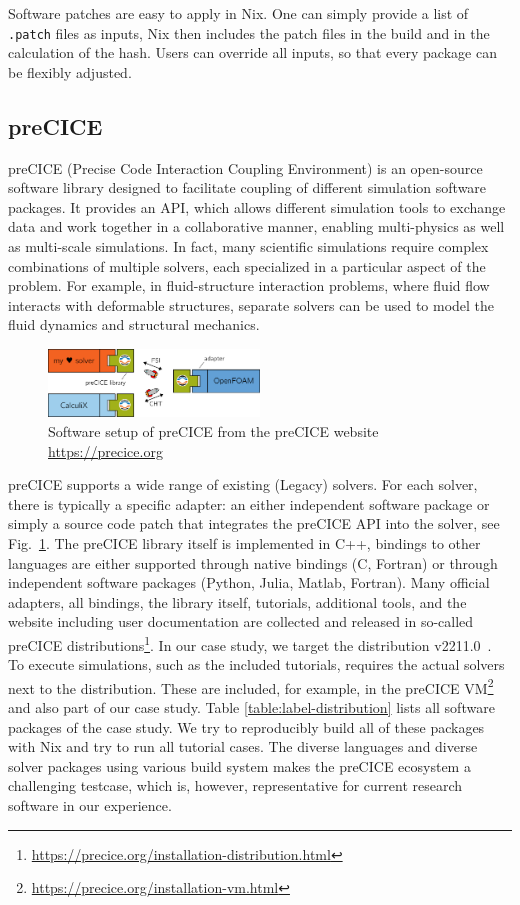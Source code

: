 \documentclass{eceasst}
\begin{document}
Software patches are easy to apply in Nix.
One can simply provide a list of \texttt{.patch} files as inputs, Nix then includes the patch files in the build and in the calculation of the hash.
Users can override all inputs, so that every package can be flexibly adjusted.


\subsection{preCICE}

preCICE (Precise Code Interaction Coupling Environment) is an open-source software library designed to facilitate coupling of different simulation software packages.
It provides an API, which allows different simulation tools to exchange data and work together in a collaborative manner, enabling multi-physics as well as multi-scale simulations.
In fact, many scientific simulations require complex combinations of multiple solvers, each specialized in a particular aspect of the problem.
For example, in fluid-structure interaction problems, where fluid flow interacts with deformable structures, separate solvers can be used to model the fluid dynamics and structural mechanics.

\begin{figure}
    \centering
    \includegraphics[width=0.5\textwidth]{figures/precice.png}
    \caption{Software setup of preCICE from the preCICE website \url{https://precice.org}}
    \label{fig:precice}
\end{figure}

preCICE supports a wide range of existing (Legacy) solvers. For each solver, there is typically a specific adapter: an either independent software package or simply a source code patch that integrates the preCICE API into the solver, see Fig.~\ref{fig:precice}.
The preCICE library itself is implemented in C++, bindings to other languages are either supported through native bindings (C, Fortran) or through independent software packages (Python, Julia, Matlab, Fortran).
Many official adapters, all bindings, the library itself, tutorials, additional tools, and the website including user documentation are collected and released in so-called preCICE distributions\footnote{\url{https://precice.org/installation-distribution.html}}.
In our case study, we target the distribution v2211.0~\cite{preciceDistribution}. To execute simulations, such as the included tutorials, requires the actual solvers next to the distribution. These are included, for example, in the preCICE VM\footnote{\url{https://precice.org/installation-vm.html}} and also part of our case study. Table \ref{table:label-distribution} lists all software packages of the case study. We try to reproducibly build all of these packages with Nix and try to run all tutorial cases.
The diverse languages and diverse solver packages using various build system makes the preCICE ecosystem a challenging testcase, which is, however, representative for current research software in our experience.
\end{document}
